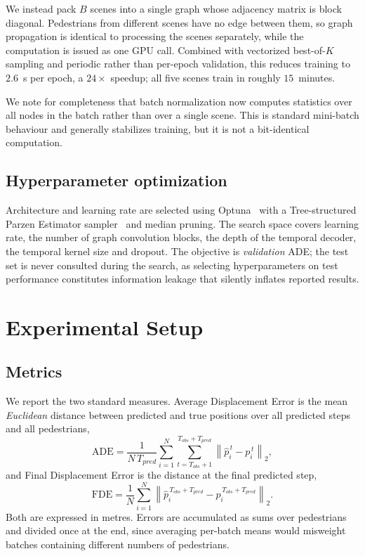 \documentclass[conference]{IEEEtran}
\begin{document}
We instead pack $B$ scenes into a single graph whose adjacency matrix is block diagonal.
Pedestrians from different scenes have no edge between them, so graph propagation is
identical to processing the scenes separately, while the computation is issued as one GPU
call. Combined with vectorized best-of-$K$ sampling and periodic rather than per-epoch
validation, this reduces training to $2.6$~s per epoch, a $24\times$ speedup; all five
scenes train in roughly $15$~minutes.

We note for completeness that batch normalization now computes statistics over all nodes
in the batch rather than over a single scene. This is standard mini-batch behaviour and
generally stabilizes training, but it is not a bit-identical computation.

\subsection{Hyperparameter optimization}

Architecture and learning rate are selected using Optuna~\cite{akiba2019optuna} with a
Tree-structured Parzen Estimator sampler~\cite{bergstra2011algorithms} and median pruning.
The search space covers learning rate, the number of graph convolution blocks, the depth of
the temporal decoder, the temporal kernel size and dropout. The objective is
\emph{validation} ADE; the test set is never consulted during the search, as selecting
hyperparameters on test performance constitutes information leakage that silently inflates
reported results.

\section{Experimental Setup}

\subsection{Metrics}

We report the two standard measures. Average Displacement Error is the mean
\emph{Euclidean} distance between predicted and true positions over all predicted steps and
all pedestrians,
\begin{equation}
\mathrm{ADE} = \frac{1}{N\,T_{pred}}\sum_{i=1}^{N}\sum_{t=T_{obs}+1}^{T_{obs}+T_{pred}}
\left\lVert \hat{p}_i^{\,t} - p_i^{\,t} \right\rVert_2 ,
\end{equation}
and Final Displacement Error is the distance at the final predicted step,
\begin{equation}
\mathrm{FDE} = \frac{1}{N}\sum_{i=1}^{N}
\left\lVert \hat{p}_i^{\,T_{obs}+T_{pred}} - p_i^{\,T_{obs}+T_{pred}} \right\rVert_2 .
\end{equation}
Both are expressed in metres. Errors are accumulated as sums over pedestrians and divided
once at the end, since averaging per-batch means would misweight batches containing
different numbers of pedestrians.
\end{document}
